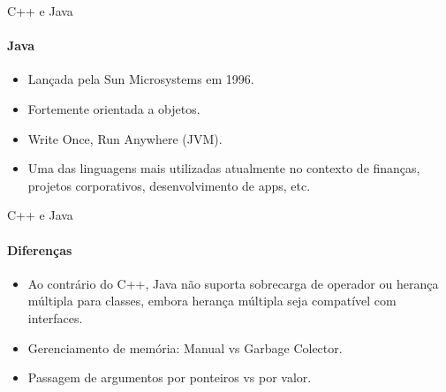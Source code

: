 \begin{frame}{C++ e Java}
\framesubtitle{Java}
\begin{itemize}
    \item Lançada pela Sun Microsystems em 1996.
    \item Fortemente orientada a objetos.
    \item Write Once, Run Anywhere (JVM).
    \item Uma das linguagens mais utilizadas atualmente no contexto de finanças, projetos corporativos, desenvolvimento de apps, etc.
\end{itemize} 
\end{frame}


\begin{frame}{C++ e Java}
\framesubtitle{Diferenças }
\begin{itemize}
    \item Ao contrário do C++, Java não suporta sobrecarga de operador ou herança múltipla para classes, embora herança múltipla seja compatível com interfaces.
    \item Gerenciamento de memória: Manual vs Garbage Colector.\cite{OOManagement}
    \item Passagem de argumentos por ponteiros vs por valor.

\end{itemize} 
\end{frame}

